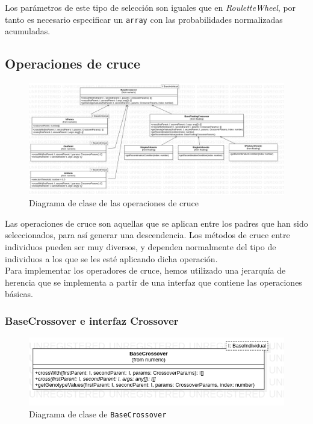 Los parámetros de este tipo de selección son iguales que en \textit{RouletteWheel}, por tanto es necesario especificar un \texttt{array} con las probabilidades normalizadas acumuladas.

\subsection{Operaciones de cruce}

\begin{figure}[ht]
    \centering
    \includegraphics[scale=0.2]{mem/images/cap-4/4.2.6(Crossover)/Crossover.png}
    \caption{Diagrama de clase de las operaciones de cruce}
    \label{fig:my_label}
\end{figure}

Las operaciones de cruce son aquellas que se aplican entre los padres que han sido seleccionados, para así generar una descendencia. Los métodos de cruce entre individuos pueden ser muy diversos, y dependen normalmente del tipo de individuos a los que se les esté aplicando dicha operación.\\

Para implementar los operadores de cruce, hemos utilizado una jerarquía de herencia que se implementa a partir de una interfaz que contiene las operaciones básicas.


\subsubsection{BaseCrossover e interfaz Crossover}

\begin{figure}[H]
    \centering
    \includegraphics[scale=0.5]{mem/images/cap-4/4.2.6(Crossover)/BaseCrossover.png}
    \caption{Diagrama de clase de \texttt{BaseCrossover}}
    \label{fig:my_label}
\end{figure}

